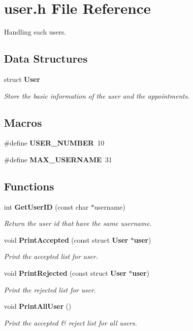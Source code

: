 \section{user.\+h File Reference}
\label{user_8h}


Handling each users.  


\subsection*{Data Structures}
\begin{DoxyCompactItemize}
\item 
struct {\bf User}
\begin{DoxyCompactList}\small\item\em Store the basic information of the user and the appointments. \end{DoxyCompactList}\end{DoxyCompactItemize}
\subsection*{Macros}
\begin{DoxyCompactItemize}
\item 
\#define {\bf U\+S\+E\+R\+\_\+\+N\+U\+M\+B\+E\+R}~10
\item 
\#define {\bf M\+A\+X\+\_\+\+U\+S\+E\+R\+N\+A\+M\+E}~31
\end{DoxyCompactItemize}
\subsection*{Functions}
\begin{DoxyCompactItemize}
\item 
int {\bf Get\+User\+I\+D} (const char $\ast$username)
\begin{DoxyCompactList}\small\item\em Return the user id that have the same username. \end{DoxyCompactList}\item 
void {\bf Print\+Accepted} (const struct {\bf User} $\ast${\bf user})
\begin{DoxyCompactList}\small\item\em Print the accepted list for user. \end{DoxyCompactList}\item 
void {\bf Print\+Rejected} (const struct {\bf User} $\ast${\bf user})
\begin{DoxyCompactList}\small\item\em Print the rejected list for user. \end{DoxyCompactList}\item 
void {\bf Print\+All\+User} ()
\begin{DoxyCompactList}\small\item\em Print the accepted \& reject list for all users. \end{DoxyCompactList}\end{DoxyCompactItemize}
